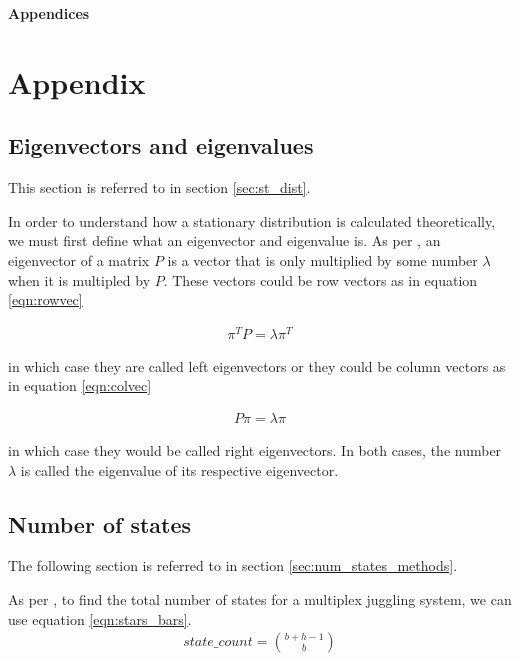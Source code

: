 \documentclass{article}
\theoremstyle{definition}
\theoremstyle{remark}
\numberwithin{equation}{section}
\begin{document}
\newpage

\begin{center}
    {\LARGE \textbf{Appendices}}
\end{center}

\appendix

\section{Appendix}

\subsection{Eigenvectors and eigenvalues} \label{sec:eig}
This section is referred to in section \ref{sec:st_dist}.

In order to understand how a stationary distribution is calculated theoretically, we must first define what an eigenvector and eigenvalue is. As per \cite[p.1723]{MarkovChains}, an eigenvector of a matrix $P$ is a vector that is only multiplied by some number $\lambda$ when it is multipled by $P$. These vectors could be row vectors as in equation \ref{eqn:rowvec}


\begin{align}
    \label{eqn:rowvec} \pi^TP = \lambda \pi^T
\end{align}

in which case they are called left eigenvectors or they could be column vectors as in equation \ref{eqn:colvec}

\begin{align}
    \label{eqn:colvec} P\pi = \lambda \pi
\end{align}

in which case they would be called right eigenvectors. In both cases, the number $\lambda$ is called the eigenvalue of its respective eigenvector.

\subsection{Number of states}\label{sec:Number of states}
The following section is referred to in section \ref{sec:num_states_methods}.


As per \cite[p.77]{Polster2003}, to find the total number of states for a multiplex juggling system, we can use equation \ref{eqn:stars_bars}. 
\begin{align}
    \label{eqn:stars_bars} state\_count = \binom{b+h-1}{b}
\end{align}
\end{document}
